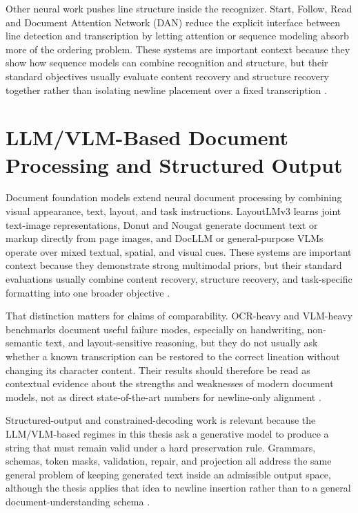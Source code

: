 Other neural work pushes line structure inside the recognizer. Start, Follow, Read and Document Attention Network (DAN) reduce the explicit interface between line detection and transcription by letting attention or sequence modeling absorb more of the ordering problem. These systems are important context because they show how sequence models can combine recognition and structure, but their standard objectives usually evaluate content recovery and structure recovery together rather than isolating newline placement over a fixed transcription .

\section{LLM/VLM-Based Document Processing and Structured Output}
\label{sec:sota_llm_vlm_structured}

Document foundation models extend neural document processing by combining visual appearance, text, layout, and task instructions. LayoutLMv3 learns joint text-image representations, Donut and Nougat generate document text or markup directly from page images, and DocLLM or general-purpose VLMs operate over mixed textual, spatial, and visual cues. These systems are important context because they demonstrate strong multimodal priors, but their standard evaluations usually combine content recovery, structure recovery, and task-specific formatting into one broader objective .

That distinction matters for claims of comparability. OCR-heavy and VLM-heavy benchmarks document useful failure modes, especially on handwriting, non-semantic text, and layout-sensitive reasoning, but they do not usually ask whether a known transcription can be restored to the correct lineation without changing its character content. Their results should therefore be read as contextual evidence about the strengths and weaknesses of modern document models, not as direct state-of-the-art numbers for newline-only alignment .

Structured-output and constrained-decoding work is relevant because the LLM/VLM-based regimes in this thesis ask a generative model to produce a string that must remain valid under a hard preservation rule. Grammars, schemas, token masks, validation, repair, and projection all address the same general problem of keeping generated text inside an admissible output space, although the thesis applies that idea to newline insertion rather than to a general document-understanding schema .


